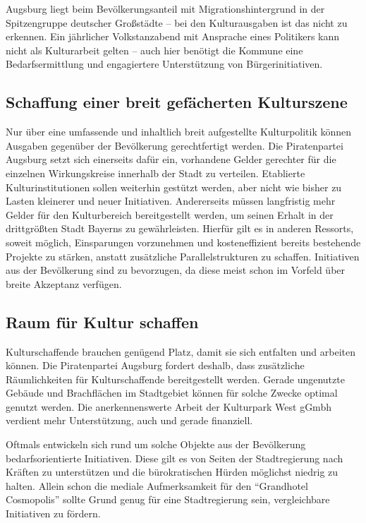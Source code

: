   Augsburg liegt beim Bevölkerungsanteil mit Migrationshintergrund in der 
  Spitzengruppe deutscher Großstädte -- bei den Kulturausgaben ist das nicht 
  zu erkennen. Ein jährlicher Volkstanzabend mit Ansprache eines Politikers 
  kann nicht als Kulturarbeit gelten -- auch hier benötigt die Kommune eine 
  Bedarfsermittlung und engagiertere Unterstützung von Bürgerinitiativen.
  
  \subsection{Schaffung einer breit gefächerten Kulturszene}
  
  Nur über eine umfassende und inhaltlich breit aufgestellte Kulturpolitik
  können Ausgaben gegenüber der Bevölkerung gerechtfertigt werden. Die 
  Piratenpartei Augsburg setzt sich einerseits dafür ein, vorhandene Gelder 
  gerechter für die einzelnen Wirkungskreise innerhalb der Stadt zu 
  verteilen. Etablierte Kulturinstitutionen sollen weiterhin gestützt werden, 
  aber nicht wie bisher zu Lasten kleinerer und neuer Initiativen. 
  Andererseits müssen langfristig mehr Gelder für den Kulturbereich 
  bereitgestellt werden, um seinen Erhalt in der drittgrößten Stadt Bayerns 
  zu gewährleisten. Hierfür gilt es in anderen Ressorts, soweit möglich, 
  Einsparungen vorzunehmen und kosteneffizient bereits bestehende Projekte zu 
  stärken, anstatt zusätzliche Parallelstrukturen zu schaffen. Initiativen 
  aus der Bevölkerung sind zu bevorzugen, da diese meist schon im Vorfeld 
  über breite Akzeptanz verfügen.
  
  \subsection{Raum für Kultur schaffen}
  
  Kulturschaffende brauchen genügend Platz, damit sie sich entfalten und 
  arbeiten können. Die Piratenpartei Augsburg fordert deshalb, dass 
  zusätzliche Räumlichkeiten für Kulturschaffende bereitgestellt werden. 
  Gerade ungenutzte Gebäude und Brachflächen im Stadtgebiet können für solche 
  Zwecke optimal genutzt werden. Die anerkennenswerte Arbeit der Kulturpark 
  West gGmbh verdient mehr Unterstützung, auch und gerade finanziell.
  
  Oftmals entwickeln sich rund um solche Objekte aus der Bevölkerung 
  bedarfsorientierte Initiativen. Diese gilt es von Seiten der Stadtregierung 
  nach Kräften zu unterstützen und die bürokratischen Hürden möglichst 
  niedrig zu halten. Allein schon die mediale Aufmerksamkeit für den 
  "`Grandhotel Cosmopolis"' sollte Grund genug für eine Stadtregierung sein, 
  vergleichbare Initiativen zu fördern.
  
